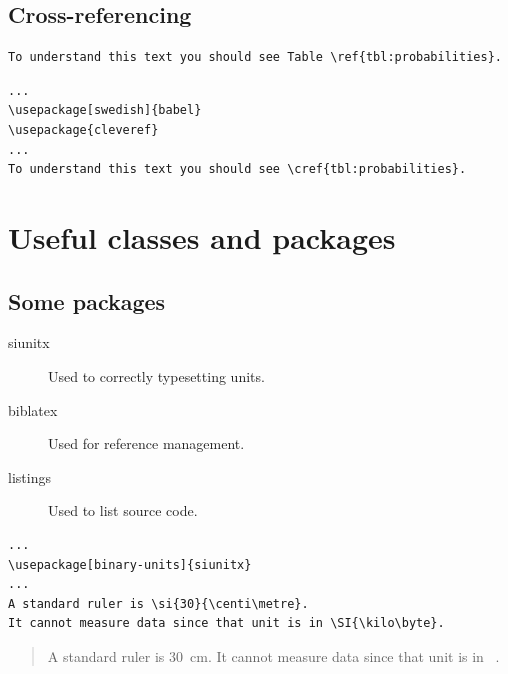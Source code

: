 \subsection{Cross-referencing}

\begin{frame}[fragile]
  \begin{example}
    \begin{lstlisting}
To understand this text you should see Table \ref{tbl:probabilities}.
    \end{lstlisting}
    \begin{lstlisting}
...
\usepackage[swedish]{babel}
\usepackage{cleveref}
...
To understand this text you should see \cref{tbl:probabilities}.
    \end{lstlisting}
  \end{example}
\end{frame}


\section{Useful classes and packages}

\subsection{Some packages}

\begin{frame}
	\begin{description}
    \item[siunitx] Used to correctly typesetting units.

    \item[biblatex] Used for reference management.

    \item[listings] Used to list source code.
  \end{description}
\end{frame}

\begin{frame}[fragile]
  \begin{example}
    \begin{lstlisting}
...
\usepackage[binary-units]{siunitx}
...
A standard ruler is \si{30}{\centi\metre}.
It cannot measure data since that unit is in \SI{\kilo\byte}.
    \end{lstlisting}
  \end{example}

  \pause

  \begin{example}
    \begin{quote}
      A standard ruler is \SI{30}{\centi\metre}.
      It cannot measure data since that unit is in \si{\kibi\byte}.
    \end{quote}
  \end{example}
\end{frame}



